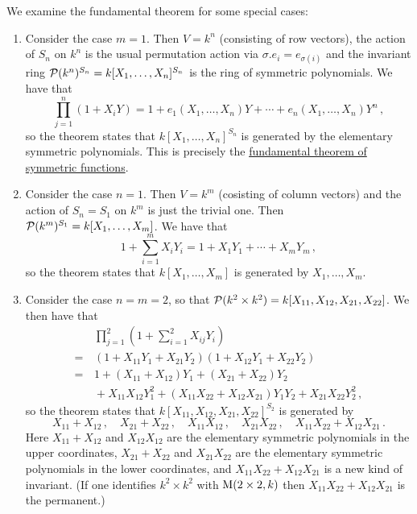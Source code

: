 \begin{example}
  We examine the fundamental theorem for some special cases:
  \begin{enumerate}
    \item
      Consider the case $m = 1$.
      Then $V = k^n$ (consisting of row vectors), the action of $S_n$ on $k^n$ is the usual permutation action via $\sigma.e_i = e_{\sigma(i)}$ and the invariant ring $\mathcal{P}(k^n)^{S_n} = k[X_1, \dotsc, X_n]^{S_n}$ is the ring of symmetric polynomials.
      We have that
      \[
          \prod_{j=1}^n ( 1 + X_i Y )
        = 1 + e_1(X_1, \dotsc, X_n) Y + \dotsb + e_n(X_1, \dotsc, X_n) Y^n \,,
      \]
      so the theorem states that $k[X_1, \dotsc, X_n]^{S_n}$ is generated by the elementary symmetric polynomials.
      This is precisely the \hyperref[theorem: fundamental theorem of symmetric functions]{fundamental theorem of symmetric functions}.
    \item
      Consider the case $n = 1$.
      Then $V = k^m$ (cosisting of column vectors) and the action of $S_n = S_1$ on $k^m$ is just the trivial one.
      Then $\mathcal{P}(k^m)^{S_1} = k[X_1, \dotsc, X_m]$.
      We have that
      \[
          1 + \sum_{i=1}^m X_i Y_i
        = 1 + X_1 Y_1 + \dotsb + X_m Y_m \,,
      \]
      so the theorem states that $k[X_1, \dotsc, X_m]$ is generated by $X_1, \dotsc, X_m$.
    \item
      Consider the case $n = m = 2$, so that $\mathcal{P}(k^2 \times k^2) = k[X_{11}, X_{12}, X_{21}, X_{22}]$.
      We then have that
      \begin{align*}
         &\,  \prod_{j=1}^2 \left( 1 + \sum_{i=1}^2 X_{ij} Y_i \right)  \\
        =&\,  (1 + X_{11} Y_1 + X_{21} Y_2)(1 + X_{12} Y_1 + X_{22} Y_2)  \\
        =&\,  1
              + (X_{11} + X_{12}) Y_1 + (X_{21} + X_{22}) Y_2 \\
         &\,  + X_{11} X_{12} Y_1^2 + (X_{11} X_{22} + X_{12} X_{21}) Y_1 Y_2 + X_{21} X_{22} Y_2^2 \,,
      \end{align*}
      so the theorem states that $k[X_{11}, X_{12}, X_{21}, X_{22}]^{S_2}$ is generated by
      \[
        X_{11} + X_{12} \,,
        \quad
        X_{21} + X_{22} \,,
        \quad
        X_{11} X_{12} \,,
        \quad
        X_{21} X_{22} \,,
        \quad
        X_{11} X_{22} + X_{12} X_{21} \,.
      \]
      Here $X_{11} + X_{12}$ and $X_{12} X_{12}$ are the elementary symmetric polynomials in the upper coordinates, $X_{21} + X_{22}$ and $X_{21} X_{22}$ are the elementary symmetric polynomials in the lower coordinates, and $X_{11} X_{22} + X_{12} X_{21}$ is a new kind of invariant.
      (If one identifies $k^2 \times k^2$ with $\operatorname{M}(2 \times 2, k)$ then $X_{11} X_{22} + X_{12} X_{21}$ is the permanent.)
  \end{enumerate}
\end{example}



